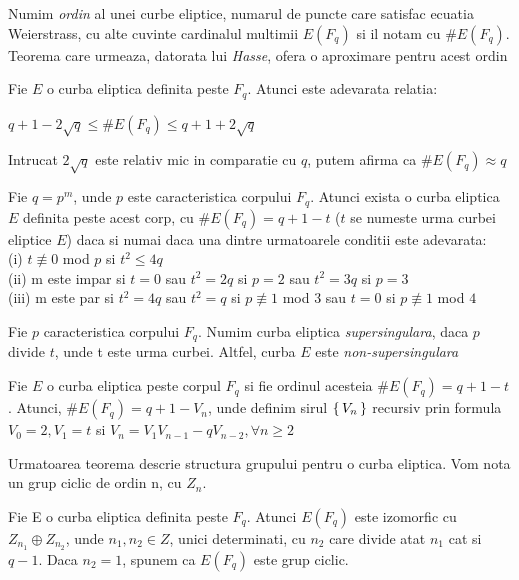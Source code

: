 \begin{dfn}
Numim \textit{ordin} al unei curbe eliptice, numarul de puncte care satisfac ecuatia Weierstrass, cu alte cuvinte cardinalul multimii $E(F_q)$ si il notam cu $\# E(F_q)$. Teorema care urmeaza, datorata lui \textit{Hasse}, ofera o aproximare pentru acest ordin
\end{dfn}
\begin{teo}
Fie $E$ o curba eliptica definita peste $F_q$. Atunci este adevarata relatia:
\begin{center} $q + 1 - 2\sqrt{q}\leq \# E(F_q)\leq q+1 + 2\sqrt{q}$ \end{center}
Intrucat $2\sqrt{q}$ este relativ mic in comparatie cu $q$, putem afirma ca $\# E(F_q) \approx q$
\end{teo}
\begin{teo}
Fie $q = p^m$, unde $p$ este caracteristica corpului $F_q$. Atunci exista o curba eliptica $E$ definita peste acest corp, cu $\# E(F_q) = q+1-t$ ($t$ se numeste urma curbei eliptice $E$) daca si numai daca una dintre urmatoarele conditii este adevarata: \\
(i) $t \not\equiv 0$ mod $p$ si $t^2\leq 4q$ \\
(ii) m este impar si $t=0$ sau $t^2 = 2q$ si $p=2$ sau $t^2 = 3q$ si $p=3$ \\ 
(iii) m este par si $t^2 = 4q$ sau $t^2 = q$ si $p\not\equiv 1$ mod $3$ sau $t= 0$ si $p\not\equiv 1$ mod $4$
\end{teo}
\begin{dfn}
Fie $p$ caracteristica corpului $F_q$. Numim curba eliptica \textit{supersingulara}, daca $p$ divide $t$, unde t este urma curbei. Altfel, curba $E$ este \textit{non-supersingulara}
\end{dfn}
\begin{teo}
Fie $E$ o curba eliptica peste corpul $F_q$ si fie ordinul acesteia $\# E(F_q)= q+ 1-t$. Atunci, $\# E(F_q) = q+ 1 - V_n$, unde definim sirul $\set {V_n}$ recursiv prin formula $V_0 = 2, V_1=t$ si $V_n = V_1V_{n-1} - qV_{n-2}, \forall n\geq 2$
\end{teo}
Urmatoarea teorema descrie structura grupului pentru o curba eliptica. Vom nota un grup ciclic de ordin n, cu $Z_n$.
\begin{teo}
Fie E o curba eliptica definita peste $F_q$. Atunci $E(F_q)$ este izomorfic cu $Z_{n_1} \oplus Z_{n_2}$, unde $n_1, n_2\in Z$, unici determinati, cu $n_2$ care divide atat $n_1$ cat si $q-1$. Daca $n_2=1$, spunem ca $E(F_q)$ este grup ciclic.
\end{teo}

